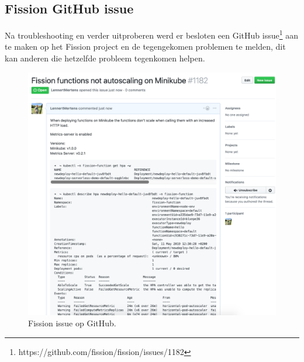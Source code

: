 \subsection{Fission GitHub issue}
\label{sec:fission-github-issue}
Na troubleshooting en verder uitproberen werd er besloten een GitHub issue\footnote{https://github.com/fission/fission/issues/1182} aan te maken op het Fission project en de tegengekomen problemen te melden, dit kan anderen die hetzelfde probleem tegenkomen helpen.
\begin{figure}
    \includegraphics[width=1\textwidth]{img/fission-github-issue.png}
    \caption{Fission issue op GitHub.}
    \label{fig:fission-github-issue}  
\end{figure}